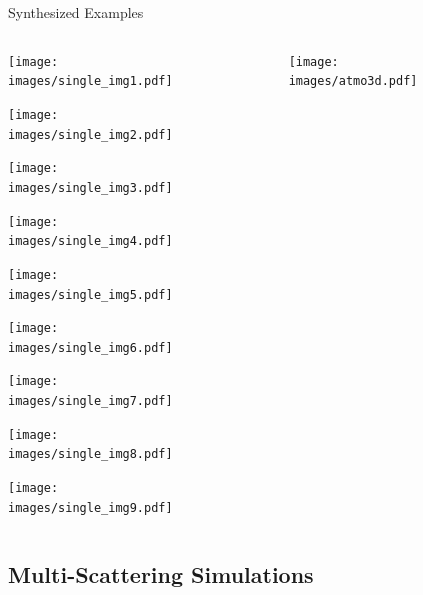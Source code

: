 \documentclass[compress,red,12pt]{beamer}
\begin{document}
\begin{frame}{Synthesized Examples}
  \begin{columns}[C]
    \begin{column}{.7\textwidth}
      \begin{overlayarea}{\columnwidth}{8cm}
        {\centerline{\texttt{[image: images/single\_img1.pdf]}}}
        {\centerline{\texttt{[image: images/single\_img2.pdf]}}}
        {\centerline{\texttt{[image: images/single\_img3.pdf]}}}
        {\centerline{\texttt{[image: images/single\_img4.pdf]}}}
        {\centerline{\texttt{[image: images/single\_img5.pdf]}}}
        {\centerline{\texttt{[image: images/single\_img6.pdf]}}}
        {\centerline{\texttt{[image: images/single\_img7.pdf]}}}
        {\centerline{\texttt{[image: images/single\_img8.pdf]}}}
        {\centerline{\texttt{[image: images/single\_img9.pdf]}}}
      \end{overlayarea}
    \end{column}
    \begin{column}{.3\textwidth}
      \begin{figure}
        \centering
        \texttt{[image: images/atmo3d.pdf]}
      \end{figure}
    \end{column}
  \end{columns}
\end{frame}


\subsection{Multi-Scattering Simulations}
\end{document}
